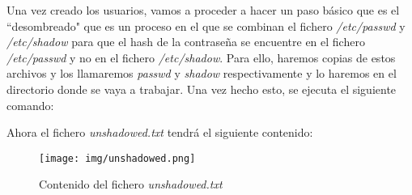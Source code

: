 \documentclass[11pt]{report}
\begin{document}
Una vez creado los usuarios, vamos a proceder a hacer un paso básico que es el “desombreado" que es 
un proceso en el que se combinan el fichero \emph{/etc/passwd} y \emph{/etc/shadow} para que el hash de
la contraseña se encuentre en el fichero \emph{/etc/passwd} y no en el fichero \emph{/etc/shadow}. Para
ello, haremos copias de estos archivos y los llamaremos \emph{passwd} y \emph{shadow} respectivamente y lo haremos
en el directorio donde se vaya a trabajar. Una vez hecho esto, se ejecuta el siguiente comando:
\lstset{style=mystyle}


Ahora el fichero \emph{unshadowed.txt} tendrá el siguiente contenido:
\begin{figure}[H]
  \centering
  \texttt{[image: img/unshadowed.png]}
  \caption{Contenido del fichero \emph{unshadowed.txt}}
  \label{fig:contenido del fichero unshadow.txt}
\end{figure}

\cleardoublepage
\end{document}
